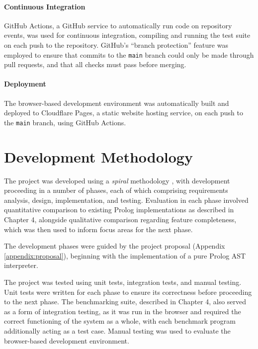 \paragraph{Continuous Integration} GitHub Actions, a GitHub service to automatically run code on repository events, was used for continuous integration, compiling and running the test suite on each push to the repository. GitHub's ``branch protection'' feature was employed to ensure that commits to the \texttt{main} branch could only be made through pull requests, and that all checks must pass before merging.

\paragraph{Deployment} The browser-based development environment was automatically built and deployed to Cloudflare Pages, a static website hosting service, on each push to the \texttt{main} branch, using GitHub Actions.

\section{Development Methodology}

\label{sec:dev-methodology}

The project was developed using a \emph{spiral} methodology \cite{boehmspiralmodelsoftware1986}, with development proceeding in a number of phases, each of which comprising requirements analysis, design, implementation, and testing. Evaluation in each phase involved quantitative comparison to existing Prolog implementations as described in Chapter 4, alongside qualitative comparison regarding feature completeness, which was then used to inform focus areas for the next phase.

The development phases were guided by the project proposal (Appendix \ref{appendix:proposal}), beginning with the implementation of a pure Prolog AST interpreter.

The project was tested using unit tests, integration tests, and manual testing. Unit tests were written for each phase to ensure its correctness before proceeding to the next phase. The benchmarking suite, described in Chapter 4, also served as a form of integration testing, as it was run in the browser and required the correct functioning of the system as a whole, with each benchmark program additionally acting as a test case. Manual testing was used to evaluate the browser-based development environment.

